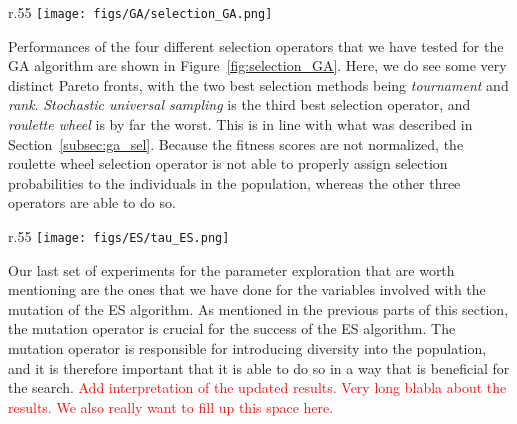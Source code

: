 \documentclass{article}
\newcommand{\todo}[1]{\textcolor{red}{#1}}
\begin{document}
\begin{wrapfigure}[12]{r}{.55\textwidth}
    \vspace{-2.5cm}
    \centering
    \texttt{[image: figs/GA/selection\_GA.png]}
    \captionsetup{width=.55\textwidth}
    \caption{
        Final function value comparison for all configurations with different selection operators for GA.
        }
        \label{fig:selection_GA}
\end{wrapfigure}

\vspace{2cm}
Performances of the four different selection operators that we have tested for the GA algorithm are shown in Figure~\ref{fig:selection_GA}.
Here, we do see some very distinct Pareto fronts, with the two best selection methods being \textit{tournament} and \textit{rank}.
\textit{Stochastic universal sampling} is the third best selection operator, and \textit{roulette wheel} is by far the worst.
This is in line with what was described in Section~\ref{subsec:ga_sel}.
Because the fitness scores are not normalized, the roulette wheel selection operator is not able to properly assign selection probabilities to the individuals in the population, whereas the other three operators are able to do so.

\newpage
    
\begin{wrapfigure}[11]{r}{.55\textwidth} %
    \vspace{-0.5cm}
    \centering
    \texttt{[image: figs/ES/tau\_ES.png]}
    \captionsetup{width=.55\textwidth}
    \caption{
        Final function value comparison for all configurations with different $\tau$ values for ES.
    }
    \label{fig:tau_ES}
\end{wrapfigure}

Our last set of experiments for the parameter exploration that are worth mentioning are the ones that we have done for the variables involved with the mutation of the ES algorithm.
As mentioned in the previous parts of this section, the mutation operator is crucial for the success of the ES algorithm.
The mutation operator is responsible for introducing diversity into the population, and it is therefore important that it is able to do so in a way that is beneficial for the search.
\todo{Add interpretation of the updated results. Very long blabla about the results. We also really want to fill up this space here.}

\vspace{5cm}
\end{document}
